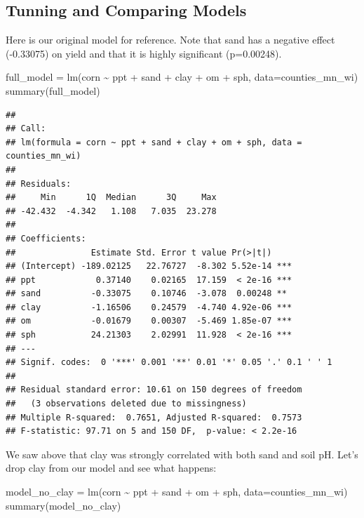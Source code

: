 \documentclass[
]{book}
\newenvironment{Shaded}{\begin{snugshade}}{\end{snugshade}}
\newcommand{\AttributeTok}[1]{\textcolor[rgb]{0.77,0.63,0.00}{#1}}
\newcommand{\FunctionTok}[1]{\textcolor[rgb]{0.00,0.00,0.00}{#1}}
\newcommand{\NormalTok}[1]{#1}
\newcommand{\OtherTok}[1]{\textcolor[rgb]{0.56,0.35,0.01}{#1}}
\newcommand{\SpecialCharTok}[1]{\textcolor[rgb]{0.00,0.00,0.00}{#1}}
\begin{document}
\hypertarget{tunning-and-comparing-models}{%
\subsection{Tunning and Comparing Models}\label{tunning-and-comparing-models}}

Here is our original model for reference. Note that sand has a negative effect (-0.33075) on yield and that it is highly significant (p=0.00248).

\begin{Shaded}
\begin{Highlighting}[]
\NormalTok{full\_model }\OtherTok{=} \FunctionTok{lm}\NormalTok{(corn }\SpecialCharTok{\textasciitilde{}}\NormalTok{ ppt }\SpecialCharTok{+}\NormalTok{ sand }\SpecialCharTok{+}\NormalTok{ clay }\SpecialCharTok{+}\NormalTok{ om }\SpecialCharTok{+}\NormalTok{ sph, }\AttributeTok{data=}\NormalTok{counties\_mn\_wi)}
\FunctionTok{summary}\NormalTok{(full\_model)}
\end{Highlighting}
\end{Shaded}

\begin{verbatim}
## 
## Call:
## lm(formula = corn ~ ppt + sand + clay + om + sph, data = counties_mn_wi)
## 
## Residuals:
##     Min      1Q  Median      3Q     Max 
## -42.432  -4.342   1.108   7.035  23.278 
## 
## Coefficients:
##               Estimate Std. Error t value Pr(>|t|)    
## (Intercept) -189.02125   22.76727  -8.302 5.52e-14 ***
## ppt            0.37140    0.02165  17.159  < 2e-16 ***
## sand          -0.33075    0.10746  -3.078  0.00248 ** 
## clay          -1.16506    0.24579  -4.740 4.92e-06 ***
## om            -0.01679    0.00307  -5.469 1.85e-07 ***
## sph           24.21303    2.02991  11.928  < 2e-16 ***
## ---
## Signif. codes:  0 '***' 0.001 '**' 0.01 '*' 0.05 '.' 0.1 ' ' 1
## 
## Residual standard error: 10.61 on 150 degrees of freedom
##   (3 observations deleted due to missingness)
## Multiple R-squared:  0.7651, Adjusted R-squared:  0.7573 
## F-statistic: 97.71 on 5 and 150 DF,  p-value: < 2.2e-16
\end{verbatim}

We saw above that clay was strongly correlated with both sand and soil pH. Let's drop clay from our model and see what happens:

\begin{Shaded}
\begin{Highlighting}[]
\NormalTok{model\_no\_clay }\OtherTok{=} \FunctionTok{lm}\NormalTok{(corn }\SpecialCharTok{\textasciitilde{}}\NormalTok{ ppt }\SpecialCharTok{+}\NormalTok{ sand }\SpecialCharTok{+}\NormalTok{ om }\SpecialCharTok{+}\NormalTok{ sph, }\AttributeTok{data=}\NormalTok{counties\_mn\_wi)}
\FunctionTok{summary}\NormalTok{(model\_no\_clay)}
\end{Highlighting}
\end{Shaded}
\end{document}
